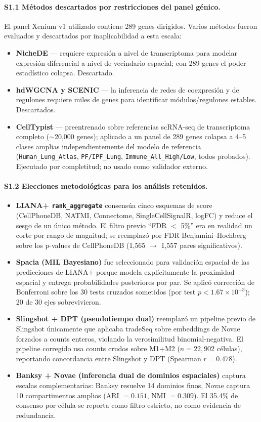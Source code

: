 \documentclass[12pt,a4paper]{article}
\begin{document}
\paragraph{S1.1 Métodos descartados por restricciones del panel génico.}
El panel Xenium v1 utilizado contiene 289 genes dirigidos. Varios métodos fueron evaluados y descartados por inaplicabilidad a esta escala:
\begin{itemize}
    \item \textbf{NicheDE} --- requiere expresión a nivel de transcriptoma para modelar expresión diferencial a nivel de vecindario espacial; con 289 genes el poder estadístico colapsa. Descartado.
    \item \textbf{hdWGCNA y SCENIC} --- la inferencia de redes de coexpresión y de regulones requiere miles de genes para identificar módulos/regulones estables. Descartados.
    \item \textbf{CellTypist} --- preentrenado sobre referencias scRNA-seq de transcriptoma completo ($\sim$20{,}000 genes); aplicado a un panel de 289 genes colapsa a 4--5 clases amplias independientemente del modelo de referencia (\texttt{Human\_Lung\_Atlas}, \texttt{PF/IPF\_Lung}, \texttt{Immune\_All\_High/Low}, todos probados). Ejecutado por completitud; no usado como validador externo.
\end{itemize}

\paragraph{S1.2 Elecciones metodológicas para los análisis retenidos.}
\begin{itemize}
    \item \textbf{LIANA+ \texttt{rank\_aggregate}} consensúa cinco esquemas de score (CellPhoneDB, NATMI, Connectome, SingleCellSignalR, logFC) y reduce el sesgo de un único método. El filtro previo ``FDR $<$ 5\%'' era en realidad un corte por rango de magnitud; se reemplazó por FDR Benjamini--Hochberg sobre los p-values de CellPhoneDB (1{,}565 $\to$ 1{,}557 pares significativos).
    \item \textbf{Spacia (MIL Bayesiano)} fue seleccionado para validación espacial de las predicciones de LIANA+ porque modela explícitamente la proximidad espacial y entrega probabilidades posteriores por par. Se aplicó corrección de Bonferroni sobre los 30 tests cruzados sometidos (por test $p < 1.67 \times 10^{-3}$); 20 de 30 ejes sobrevivieron.
    \item \textbf{Slingshot + DPT (pseudotiempo dual)} reemplazó un pipeline previo de Slingshot únicamente que aplicaba tradeSeq sobre embeddings de Novae forzados a counts enteros, violando la verosimilitud binomial-negativa. El pipeline corregido usa counts crudos sobre M1+M2 ($n=22{,}902$ células), reportando concordancia entre Slingshot y DPT (Spearman $r=0.478$).
    \item \textbf{Banksy + Novae (inferencia dual de dominios espaciales)} captura escalas complementarias: Banksy resuelve 14 dominios finos, Novae captura 10 compartimentos amplios (ARI $=0.151$, NMI $=0.309$). El 35.4\% de consenso por célula se reporta como filtro estricto, no como evidencia de redundancia.
\end{itemize}
\end{document}
